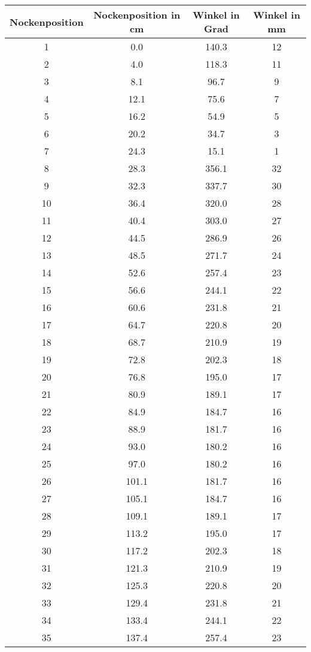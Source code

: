 \documentclass[10pt, a4paper]{article}
\begin{document}
\begin{center}
	\begin{tabular}{c|c|c|c}
		Nockenposition & Nockenposition in cm & Winkel in Grad & Winkel in mm \\
		\hline
		1 & 0.0 & 140.3 & 12 \\
		2 & 4.0 & 118.3 & 11 \\
		3 & 8.1 & 96.7 & 9 \\
		4 & 12.1 & 75.6 & 7 \\
		5 & 16.2 & 54.9 & 5 \\
		6 & 20.2 & 34.7 & 3 \\
		7 & 24.3 & 15.1 & 1 \\
		8 & 28.3 & 356.1 & 32 \\
		9 & 32.3 & 337.7 & 30 \\
		10 & 36.4 & 320.0 & 28 \\
		11 & 40.4 & 303.0 & 27 \\
		12 & 44.5 & 286.9 & 26 \\
		13 & 48.5 & 271.7 & 24 \\
		14 & 52.6 & 257.4 & 23 \\
		15 & 56.6 & 244.1 & 22 \\
		16 & 60.6 & 231.8 & 21 \\
		17 & 64.7 & 220.8 & 20 \\
		18 & 68.7 & 210.9 & 19 \\
		19 & 72.8 & 202.3 & 18 \\
		20 & 76.8 & 195.0 & 17 \\
		21 & 80.9 & 189.1 & 17 \\
		22 & 84.9 & 184.7 & 16 \\
		23 & 88.9 & 181.7 & 16 \\
		24 & 93.0 & 180.2 & 16 \\
		25 & 97.0 & 180.2 & 16 \\
		26 & 101.1 & 181.7 & 16 \\
		27 & 105.1 & 184.7 & 16 \\
		28 & 109.1 & 189.1 & 17 \\
		29 & 113.2 & 195.0 & 17 \\
		30 & 117.2 & 202.3 & 18 \\
		31 & 121.3 & 210.9 & 19 \\
		32 & 125.3 & 220.8 & 20 \\
		33 & 129.4 & 231.8 & 21 \\
		34 & 133.4 & 244.1 & 22 \\
		35 & 137.4 & 257.4 & 23 \\

\end{tabular}
\end{center}
\end{document}

